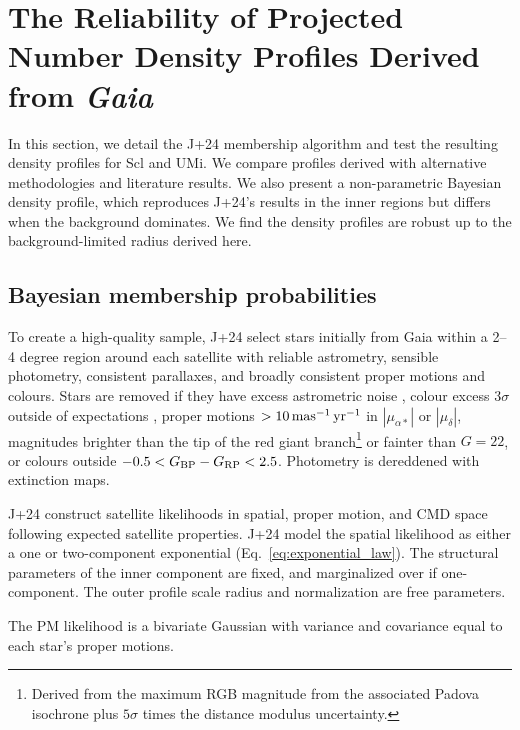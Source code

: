 \chapter{\texorpdfstring{The Reliability of Projected Number Density
Profiles Derived from
\emph{Gaia}}{The Reliability of Projected Number Density Profiles Derived from Gaia}}\label{sec:extra_density}

In this section, we detail the J+24 membership algorithm and test the
resulting density profiles for Scl and UMi. We compare profiles derived
with alternative methodologies and literature results. We also present a
non-parametric Bayesian density profile, which reproduces J+24's results
in the inner regions but differs when the background dominates. We find
the density profiles are robust up to the background-limited radius
derived here.

\section{Bayesian membership
probabilities}\label{bayesian-membership-probabilities}

To create a high-quality sample, J+24 select stars initially from Gaia
within a 2--4 degree region around each satellite with reliable
astrometry, sensible photometry, consistent parallaxes, and broadly
consistent proper motions and colours. Stars are removed if they have
excess astrometric noise \citep[\({\rm ruwe} > 1.3\),
see][]{lindegren+2021}, colour excess \(3\sigma\) outside of
expectations \citep[from][]{riello+2021}, proper motions \(>10\,{\rm mas^{-1}\,yr^{-1}}\)
in \(|\mu_{\alpha*}|\) or \(|\mu_\delta|\), magnitudes brighter than the
tip of the red giant branch\footnote{Derived from the maximum RGB
  magnitude from the associated Padova isochrone plus
  \(5\sigma\)\hspace{0pt} times the distance modulus uncertainty.} or
fainter than \(G=22\), or colours outside
\(-0.5 < G_{\rm BP} - G_{\rm RP} <  2.5\). Photometry is dereddened with
\citet{schlegel+finkbeiner+davis1998} extinction maps.

J+24 construct satellite likelihoods in spatial, proper motion, and CMD
space following expected satellite properties. J+24 model the spatial
likelihood as either a one or two-component exponential
(Eq.~\ref{eq:exponential_law}). The structural parameters of the inner
component are fixed, and marginalized over if one-component. The outer
profile scale radius and normalization are free parameters.

The PM likelihood is a bivariate Gaussian with variance and covariance
equal to each star's proper motions.

